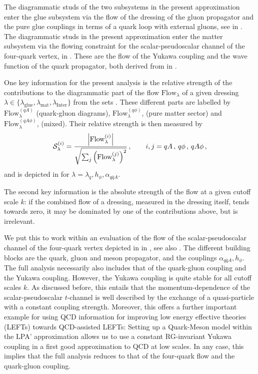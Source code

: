\documentclass[aps,twocolumn,prd,superscriptaddress]{revtex4-2}
\begin{document}
The diagrammatic studs of the two subsystems in the present approximation enter the glue subsystem via the flow of the dressing of the gluon propagator and the pure glue couplings in terms of a quark loop with external gluons, see  in . The diagrammatic studs in the present approximation enter the matter subsystem via the flowing constraint for the scalar-pseudoscalar channel of the four-quark vertex,  in . These are the flow of the Yukawa coupling and the wave function of the quark propagator, both derived from  in . 

One key information for the present analysis is the relative strength of the contributions to the diagrammatic part of the flow $\textrm{Flow}_{\lambda}$ of a given dressing $\lambda\in\{\lambda_\textrm{glue}, \lambda_{\textrm{mat}},\lambda_\textrm{Inter}\}$ from the sets . These different parts are labelled by $\textrm{Flow}^{(qA)}_{\lambda}$ (quark-gluon diagrams), $\textrm{Flow}^{(q\phi)}_{\lambda}$, (pure matter sector) and $\textrm{Flow}^{(qA\phi)}_{\lambda}$, (mixed). Their relative strength is then measured by 
%
\begin{align}
	{\cal S}_\lambda^{(i)} = \frac{\left |\textrm{Flow}^{(i)}_{\lambda}\right|}{\sqrt{ \sum_j \left(\textrm{Flow}^{(j)}_{\lambda}\right)^2}}\,,\qquad i,j= qA\,,\, q\phi\,,\,qA\phi\,,
	\label{eq:Strength}
\end{align} 
%
and is depicted in  for $\lambda=\lambda_q, h_\phi, \alpha_{q\bar q A}$. 

The second key information is the absolute strength of the flow at a given cutoff scale $k$: if the combined flow of a dressing, measured in the dressing itself, tends towards zero, it may be dominated by one of the contributions above, but is irrelevant. 

We put this to work within an evaluation of the flow of the scalar-pseudoscalar channel of the four-quark vertex depicted in  in , see also \cite{Fu:2019hdw}. The different building blocks are the quark, gluon and meson propagator, and the couplings $\alpha_{q\bar q A}, h_\phi$. The full analysis necessarily also includes that of the quark-gluon coupling and the Yukawa coupling. However, the Yukawa coupling is quite stable for all cutoff scales $k$. As discussed before, this entails that the momentum-dependence of the scalar-pseudoscalar $t$-channel is well described by the exchange of a quasi-particle with a constant coupling strength. Moreover, this offers a further important example for using QCD information for improving low energy effective theories (LEFTs) towards QCD-assisted LEFTs: Setting up a Quark-Meson model within the LPA' approximation allows us to use a constant RG-invariant Yukawa coupling in a first good approximation to QCD at low scales. In any case, this implies that the full analysis reduces to that of the four-quark flow and the quark-gluon coupling. 
\end{document}
